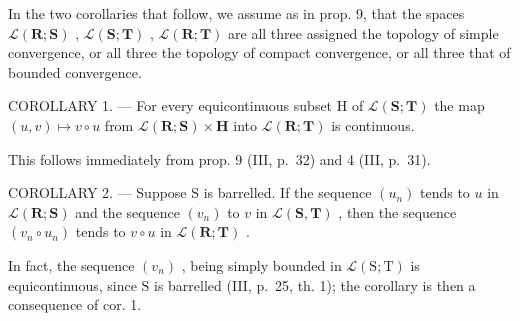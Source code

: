 In the two corollaries that follow, we assume as in prop. 9, that the spaces \(\mathcal{L}(\mathbf{R};\mathbf{S})\) , \(\mathcal{L}(\mathbf{S};\mathbf{T})\) , \(\mathcal{L}(\mathbf{R};\mathbf{T})\) are all three assigned the topology of simple convergence, or all three the topology of compact convergence, or all three that of bounded convergence.

COROLLARY 1. --- For every equicontinuous subset H of \(\mathcal{L}(\mathbf{S};\mathbf{T})\) the map \((u,v)\mapsto v\circ u\) from \(\mathcal{L}(\mathbf{R};\mathbf{S})\times \mathbf{H}\) into \(\mathcal{L}(\mathbf{R};\mathbf{T})\) is continuous.

This follows immediately from prop. 9 (III, p.~32) and 4 (III, p.~31).

COROLLARY 2. --- Suppose S is barrelled. If the sequence \((u_n)\) tends to \(u\) in \(\mathcal{L}(\mathbf{R};\mathbf{S})\) and the sequence \((v_{n})\) to \(v\) in \(\mathcal{L}(\mathbf{S},\mathbf{T})\) , then the sequence \((v_{n}\circ u_{n})\) tends to \(v\circ u\) in \(\mathcal{L}(\mathbf{R};\mathbf{T})\) .

In fact, the sequence \((v_{n})\) , being simply bounded in \(\mathcal{L}(\mathrm{S};\mathrm{T})\) is equicontinuous, since \(\mathrm{S}\) is barrelled (III, p.~25, th. 1); the corollary is then a consequence of cor. 1.

